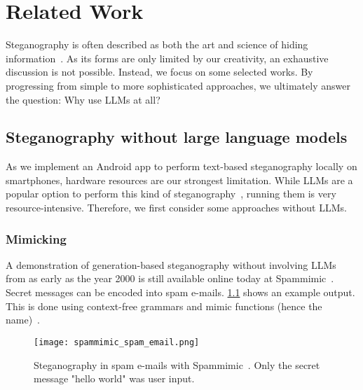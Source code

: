 
\chapter{Related Work}\label{ch:relatedwork}
\glsresetall %

Steganography is often described as both the art and science of hiding information~\cite{bennettLinguisticSteganographySurvey2004}. As its forms are only limited by our creativity, an exhaustive discussion is not possible. Instead, we focus on some selected works. By progressing from simple to more sophisticated approaches, we ultimately answer the question: Why use \glspl{LLM} at all?

\section{Steganography without large language models}
\label{sec:steganographyWithoutLLMs}
As we implement an Android app to perform text-based steganography locally on smartphones, hardware resources are our strongest limitation. While \glspl{LLM} are a popular option to perform this kind of steganography~\cite{zieglerNeuralLinguisticSteganography2019}, running them is very resource-intensive. Therefore, we first consider some approaches without \glspl{LLM}.

\subsection{Mimicking}
\label{sec:mimicking}
A demonstration of generation-based steganography without involving \glspl{LLM} from as early as the year 2000 is still available online today at Spammimic~\cite{spammimicSpammimic2000,dembartEndUserHide2001,bennettLinguisticSteganographySurvey2004}. Secret messages can be encoded into spam e-mails. \cref{fig:spammimicSpamEmail} shows an example output. This is done using context-free grammars and mimic functions (hence the name)~\cite{waynerMimicFunctions1992,bennettLinguisticSteganographySurvey2004}.

\begin{figure}
    \begin{wide}
        \centering
        \captionsetup{width=\linewidth}
        \texttt{[image: spammimic\_spam\_email.png]}
        \caption[Spammimic]{Steganography in spam e-mails with Spammimic~\cite{spammimicSpammimic2000}. Only the secret message "hello world" was user input.}
        \label{fig:spammimicSpamEmail}
    \end{wide}
\end{figure}


